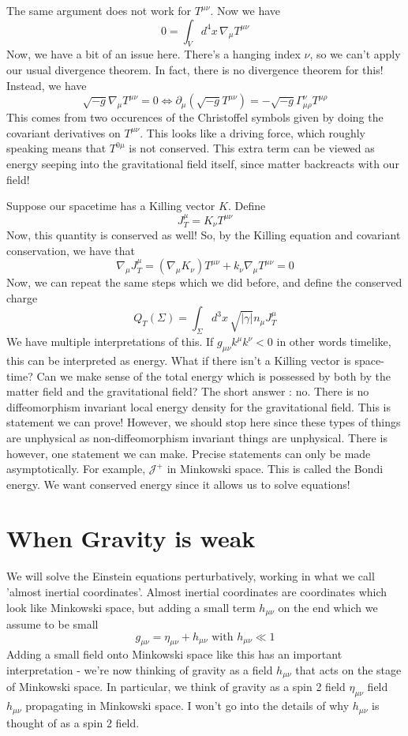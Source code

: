 The same argument does not work 
for $ T ^{ \mu \nu } $. Now we have 
\[
0 = \int _ V  d^ 4 x \, \nabla _ \mu T ^{ \mu \nu }  
\] Now, we have a bit of an issue here. 
There's a hanging index $ \nu $, so 
we can't apply our usual divergence theorem. 
In fact, there is no divergence theorem for this! 
Instead, we have 
\[
\sqrt{ - g } \nabla _ \mu T ^{ \mu \nu }  =0 \iff 
\partial  _ \mu \left( \sqrt{ - g }  T ^{ \mu \nu }  \right)   = 
- \sqrt{ -g } \Gamma ^ \nu _{ \mu \rho } T ^{ \mu \rho }  
\] This comes from two occurences of the Christoffel 
symbols given by doing the covariant derivatives on $ T ^{ \mu \nu } $. This looks like a 
driving force, which roughly speaking means 
that $ T ^{ 0 \mu } $ is not  conserved. 
This extra term can be viewed as 
energy seeping into the gravitational field 
itself, since matter backreacts with our field!

Suppose our spacetime has a Killing vector $ K $. 
Define 
\[
J _ T ^\mu  = K _ \nu T ^{ \mu \nu   } 
\]  Now, this 
quantity is conserved as well! So, 
by the Killing equation and covariant 
conservation, we have that 
\[
\nabla _ \mu J _ T ^ \mu  = \left( \nabla _ \mu K _ \nu  \right)  T ^{ \mu \nu } 
+ k _ \nu \nabla _ \mu T ^{ \mu \nu }  = 0 
\] Now, we can repeat the same steps which we did before, 
and define the conserved charge 
\[
Q _ T ( \Sigma ) = \int _{ \Sigma } d ^ 3 x \, \sqrt{ | \gamma | }  n_ \mu J ^ \mu _ T 
\] We have multiple interpretations 
of this. 
If $ g _{ \mu \nu } k ^ \mu k ^ \nu < 0  $ in other words timelike, 
this can be interpreted as energy. 
What if there isn't a Killing vector 
is space-time? 
Can we make sense of the total energy which 
is possessed by both by the matter field and the gravitational 
field? 
The short answer : no.  
There is no diffeomorphism invariant local energy density 
for the gravitational field. 
This is statement we can prove! However, 
we should stop here since these types of things 
are unphysical as non-diffeomorphism 
invariant things are unphysical.
There is however, one statement we can make. 
Precise statements can only be made asymptotically. 
For example, $ \mathscr{J } ^ + $  in Minkowski space.
This is called the Bondi energy. 
We want conserved energy since it allows us to solve equations!

\pagebreak 
\section{When Gravity is weak} 
We will solve the Einstein equations 
perturbatively, working in what 
we call 'almost inertial coordinates'.
Almost inertial coordinates are coordinates which 
look like Minkowski space, but adding a small term 
$ h_{ \mu \nu }  $ on the end which we assume to be small
\[
g _{ \mu \nu } = \eta _{ \mu \nu } + h _{ \mu \nu } \text{ with } h _{ \mu \nu } \ll 1 
\]
Adding a small field onto Minkowski space 
like this has an important interpretation  - 
we're now thinking of gravity as a field $ h _{ \mu \nu } $ 
that acts on the stage of Minkowski space. 
In particular, 
we think of gravity as a spin 2 field $ \eta_{ \mu \nu } $ 
field $ h _{ \mu \nu } $ propagating in Minkowski 
space. I won't go into the details of why $ h _{ \mu \nu }  $ 
is thought of as a spin $ 2 $  field. 

